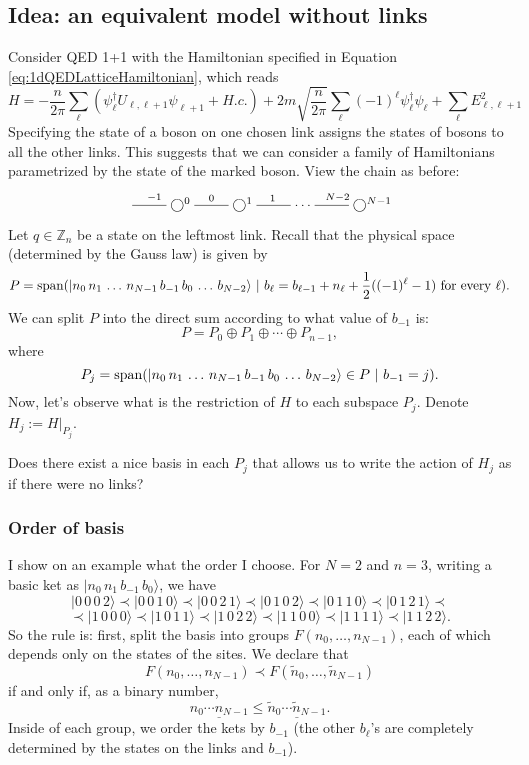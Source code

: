 	
	\subsection{Idea: an equivalent model without links}
	Consider QED 1+1 with the Hamiltonian specified in Equation \ref{eq:1dQEDLatticeHamiltonian}, which reads 
\[
	H=-\frac{n}{2\pi} \sum_\ell (\psi_\ell^\dagger U_{\ell,\ell+1}\psi_{\ell+1}+H.c.) + 2m\sqrt{\frac{n}{2\pi}}\sum_\ell (-1)^\ell \psi_\ell^\dagger\psi_\ell+  \sum_{\ell} E_{\ell,\ell+1}^2
\]
Specifying the state of a boson on one chosen link assigns the states of bosons to all the other links. This suggests that we can consider a family of Hamiltonians parametrized by the state of the marked boson. View the chain as before:
	\[
	\xymatrix{
	\ar@{-}[r]^{-1} & \bigcirc^0 \ar@{-}[r]^{0} &  \bigcirc^1 \ar@{-}[r]^{1} & \cdots & \ar@{-}[l]_{N-2} \bigcirc^{N-1}
	}
	\]
	Let $q \in \mathbb Z_n$ be a state on the leftmost link. Recall that the physical space (determined by the Gauss law) is given by
	\[
	P = \operatorname{span} ( |n_0\, n_1\, \ldots \, n_{N-1} \, b_{-1}\, b_0\, \ldots\, b_{N-2}\rangle \ | \ b_{\ell} =b_{\ell-1} + n_{\ell} + \frac{1}{2}((-1)^\ell-1) \ \text{for every} \ \ell).
	\]
	We can split $P$ into the direct sum according to what value of $b_{-1}$ is:
	\[
	P = P_0 \oplus P_1 \oplus \cdots \oplus P_{n-1},
	\]
	where
	\[
	P_j = \operatorname{span}( |n_0\, n_1\, \ldots \, n_{N-1} \, b_{-1}\, b_0\, \ldots\, b_{N-2}\rangle \in P \ | \ b_{-1} = j).
	\]
	Now, let's observe what is the restriction of $H$ to each subspace $P_j$. Denote $H_j := H|_{P_j}$.
\begin{idea}
Does there exist a nice basis in each $P_j$ that allows us to write the action of $H_j$ as if there were no links?
\end{idea}

\subsubsection{Order of basis}
I show on an example what the order I choose. For $N=2$ and $n=3$, writing a basic ket as $|n_0\, n_1\, b_{-1}\, b_0\rangle$, we have
\[
|0\, 0\, 0\, 2\rangle \prec |0\, 0\, 1\, 0\rangle \prec |0\, 0\, 2\, 1\rangle \prec 
 |0\, 1\, 0\, 2\rangle \prec |0\, 1\, 1\, 0\rangle \prec |0\,1\, 2\, 1\rangle \prec
\]\[
\prec |1\, 0\, 0\, 0\rangle \prec |1\, 0\, 1\, 1\rangle \prec |1\, 0\, 2\, 2\rangle \prec
|1\, 1\, 0\, 0\rangle \prec |1\, 1\, 1\, 1\rangle \prec |1\, 1\, 2\, 2\rangle.
\]
So the rule is: first, split the basis into groups $F(n_0,\ldots,n_{N-1})$, each of which depends only on the states of the sites. We declare that
\[
F(n_0,\ldots,n_{N-1}) \prec F(\tilde{n}_0,\ldots,\tilde{n}_{N-1})
\]
if and only if, as a binary number,
\[
\underline{n_0\cdots n_{N-1}} \leq \underline{\tilde{n}_0\cdots \tilde{n}_{N-1}}.
\]
Inside of each group, we order the kets by $b_{-1}$ (the other $b_{\ell}$'s are completely determined by the states on the links and $b_{-1}$).

